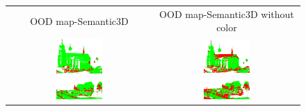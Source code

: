     \begin{figure}[h!]
        \centering
        \begin{tabular}{cc}
            OOD map-Semantic3D & OOD map-Semantic3D without color \\
            \includegraphics[width=0.33\textwidth, height=0.18\textheight]{images/ood_imgs/sem3d_of/prob/fout_sem3d_OOD_1.pdf}&
            \includegraphics[width=0.33\textwidth, height=0.18\textheight]{images/ood_imgs/sem3d_of/prob/fout_sem3d_of_OOD_1.pdf}\\

            \includegraphics[width=0.33\textwidth, height=0.18\textheight]{images/ood_imgs/sem3d_of/prob/fout_sem3d_OOD_2.pdf}&
            \includegraphics[width=0.33\textwidth, height=0.18\textheight]{images/ood_imgs/sem3d_of/prob/fout_sem3d_of_OOD_2.pdf}\\


\end{tabular}
\end{figure}
